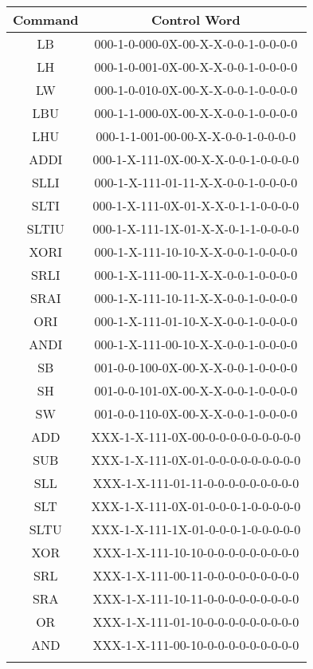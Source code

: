 	\clearpage
		
	\begin{center}
		\begin{threeparttable}[!ht]
			\begin{tabular}{|c|c|} \hline
				
				\setrow{\bfseries}Command &\setrow{\bfseries}Control Word\\\hline
				LB   &000-1-0-000-0X-00-X-X-0-0-1-0-0-0-0 \\\hline
				LH   &000-1-0-001-0X-00-X-X-0-0-1-0-0-0-0\\\hline
				LW   &000-1-0-010-0X-00-X-X-0-0-1-0-0-0-0\\\hline
				LBU  &000-1-1-000-0X-00-X-X-0-0-1-0-0-0-0\\\hline
				LHU  &000-1-1-001-00-00-X-X-0-0-1-0-0-0-0\\\Xhline{5\arrayrulewidth}
				
				ADDI &000-1-X-111-0X-00-X-X-0-0-1-0-0-0-0\\\hline
				SLLI &000-1-X-111-01-11-X-X-0-0-1-0-0-0-0\\\hline
				SLTI &000-1-X-111-0X-01-X-X-0-1-1-0-0-0-0\\\hline 
				SLTIU&000-1-X-111-1X-01-X-X-0-1-1-0-0-0-0\\\hline 
				XORI &000-1-X-111-10-10-X-X-0-0-1-0-0-0-0\\\hline 
				SRLI &000-1-X-111-00-11-X-X-0-0-1-0-0-0-0\\\hline
				SRAI &000-1-X-111-10-11-X-X-0-0-1-0-0-0-0\\\hline
				ORI  &000-1-X-111-01-10-X-X-0-0-1-0-0-0-0\\\hline
				ANDI &000-1-X-111-00-10-X-X-0-0-1-0-0-0-0\\\Xhline{5\arrayrulewidth}
				
				SB &001-0-0-100-0X-00-X-X-0-0-1-0-0-0-0\\\hline
				SH &001-0-0-101-0X-00-X-X-0-0-1-0-0-0-0\\\hline
				SW &001-0-0-110-0X-00-X-X-0-0-1-0-0-0-0\\\Xhline{5\arrayrulewidth}
				
				ADD &XXX-1-X-111-0X-00-0-0-0-0-0-0-0-0-0\\\hline
				SUB &XXX-1-X-111-0X-01-0-0-0-0-0-0-0-0-0\\\hline
				SLL &XXX-1-X-111-01-11-0-0-0-0-0-0-0-0-0\\\hline
				SLT &XXX-1-X-111-0X-01-0-0-0-1-0-0-0-0-0\\\hline
				SLTU&XXX-1-X-111-1X-01-0-0-0-1-0-0-0-0-0\\\hline
				XOR &XXX-1-X-111-10-10-0-0-0-0-0-0-0-0-0\\\hline
				SRL &XXX-1-X-111-00-11-0-0-0-0-0-0-0-0-0\\\hline
				SRA &XXX-1-X-111-10-11-0-0-0-0-0-0-0-0-0\\\hline
				OR  &XXX-1-X-111-01-10-0-0-0-0-0-0-0-0-0\\\hline
				AND &XXX-1-X-111-00-10-0-0-0-0-0-0-0-0-0\\\Xhline{5\arrayrulewidth}
				

\end{tabular}
\end{threeparttable}
\end{center}
